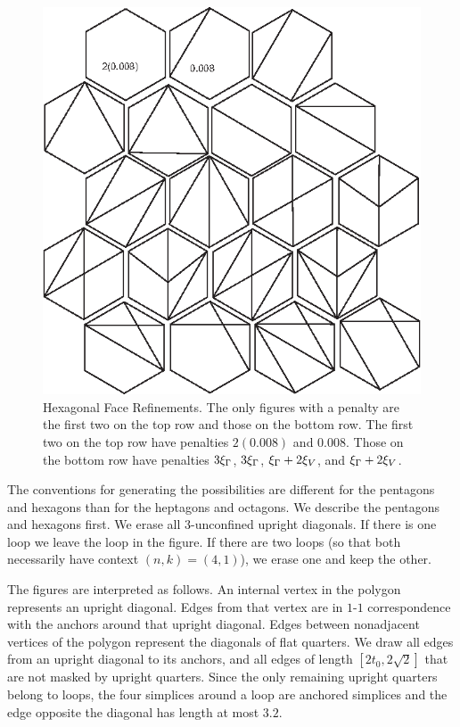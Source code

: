 \begin{figure}[htb]
  \centering
  \includegraphics{PS/hexrefine_xxx.eps}
  \caption{Hexagonal Face Refinements.
    The only figures with a penalty are the first two on the top
    row and those on the bottom row.  The first two on the top row
    have penalties $2(0.008)$ and $0.008$.  Those on the bottom
    row have penalties $3\xi_\Gamma$, $3\xi_\Gamma$, $\xi_\Gamma+2\xi_V$, and
    $\xi_\Gamma+2\xi_V$.
  }
  \label{fig:hexrefine}
\end{figure}

The conventions for generating the possibilities are different for
the pentagons and hexagons than for the heptagons and octagons. We
describe the pentagons and hexagons first.  We erase all
$3$-unconfined upright diagonals. If there is one loop we leave
the loop in the figure. If there are two loops (so that both
necessarily have context $(n,k)=(4,1)$), we erase one and keep the
other.

The figures are interpreted as follows.  An internal vertex in the
polygon represents an upright diagonal.  Edges from that vertex are
in $1$-$1$ correspondence with the anchors around that upright
diagonal.  Edges between nonadjacent vertices of the polygon
represent the diagonals of flat quarters.  We draw all edges from an
upright diagonal to its anchors, and all edges of length
$[2t_0,2\sqrt2]$ that are not masked by upright quarters. Since the
only remaining upright quarters belong to loops, the four simplices
around a loop are anchored simplices and the edge opposite the
diagonal has length at most $3.2$.

